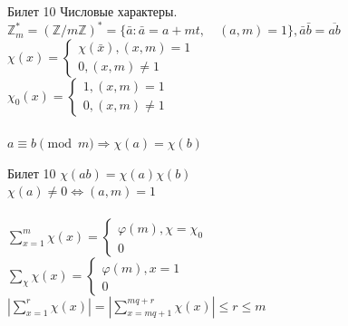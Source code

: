 \documentclass[a4paper,12pt]{article}
\newcommand{\ee}{\equiv}
\newcommand{\FI}{\varphi}
\newcommand{\q}{\quad}
\newcommand{\Ra}{\Rightarrow}
\newcommand{\bb}[1]{\mathbb{#1}}
\newcommand{\SL}{\sum\limits}
\newcommand{\os}{\left(}
\newcommand{\cs}{\right)}
\begin{document}
\begin{mybox2}{{Билет 10}}
Числовые характеры.\\
$\bb{Z}_m^* = \os \bb{Z}/m\bb{Z}  \cs^* = \{\bar{a}: \bar{a} = a + mt,\q (a,m) = 1 \}, \bar{a}\bar{b} = \overline{ab}  $\\
$\chi(x) = \begin{cases} \chi(\bar{x}), (x,m)=1\\0,(x,m) \not=1 \end{cases} $\\
$\chi_0(x) = \begin{cases} 1, (x,m)=1\\0,(x,m) \not=1 \end{cases} $\\\q\\
$a\ee b \pmod{m} \Ra \chi(a) = \chi(b) $\\
\end{mybox2}
\newpage
\begin{mybox2}{{Билет 10}}
$\chi(ab) = \chi(a)\chi(b) $\\
$\chi(a)\not=0 \iff (a,m)=1$\\\q\\
$\SL_{x=1}^m \chi(x) = \begin{cases} \FI(m), \chi = \chi_0\\0 \end{cases} $\\
$\SL_{\chi} \chi(x) = \begin{cases} \FI(m), x = 1\\0 \end{cases} $\\
$\left|\SL_{x=1}^{r} \chi(x) \right| = \left|\SL_{x=mq+1}^{mq+r} \chi(x)\right|\le r\le m$
\end{mybox2}
\end{document}
